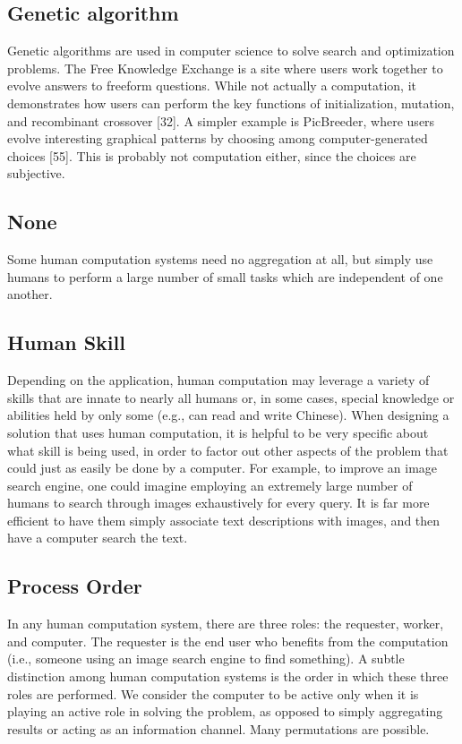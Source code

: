 \documentclass{sig-alternate}
\begin{document}
\subsection*{Genetic algorithm}
Genetic algorithms are used in computer science to solve search and optimization problems. The Free Knowledge Exchange is a site where users work together to evolve answers to freeform questions. While not actually a computation, it demonstrates how users can perform the key functions of initialization, mutation, and recombinant crossover [32]. A simpler example is PicBreeder, where users evolve interesting graphical patterns by choosing among computer-generated choices [55]. This is probably not computation either, since the choices are subjective.
\subsection*{None}
Some human computation systems need no aggregation at all, but simply use humans to perform a large number of small tasks which are independent of one another.
\subsection*{Human Skill}
Depending on the application, human computation may leverage a variety of skills that are innate to nearly all humans or, in some cases, special knowledge or abilities held by only some (e.g., can read and write Chinese). When designing a solution that uses human computation, it is helpful to be very specific about what skill is being used, in order to factor out other aspects of the problem that could just as easily be done by a computer. For example, to improve an image search engine, one could imagine employing an extremely large number of humans to search through images exhaustively for every query. It is far more efficient to have them simply associate text descriptions with images, and then have a computer search the text.
\subsection*{Process Order}
In any human computation system, there are three roles: the requester, worker, and computer. The requester is the end user who benefits from the computation (i.e., someone using an image search engine to find something). A subtle distinction among human computation systems is the order in which these three roles are performed. We consider the computer to be active only when it is playing an active role in solving the problem, as opposed to simply aggregating results or acting as an information channel. Many permutations are possible.
\end{document}
